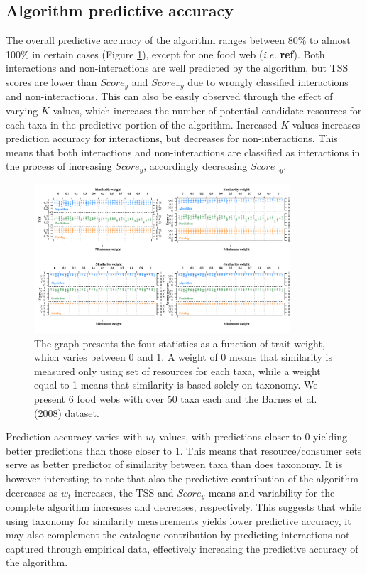 \documentclass[letterpaper]{article}
\begin{document}
    \subsection{Algorithm predictive accuracy}
The overall predictive accuracy of the algorithm ranges between 80\% to almost 100\% in certain cases (Figure \ref{fig:multi_param}), except for one food web (\textit{i.e.} \textbf{ref}). Both interactions and non-interactions are well predicted by the algorithm, but TSS scores are lower than $Score_y$ and $Score_{\neg y}$ due to wrongly classified interactions and non-interactions. This can also be easily observed through the effect of varying $K$ values, which increases the number of potential candidate resources for each taxa in the predictive portion of the algorithm. Increased $K$ values increases prediction accuracy for interactions, but decreases for non-interactions. This means that both interactions and non-interactions are classified as interactions in the process of increasing $Score_y$, accordingly decreasing $Score_{\neg y}$.

\begin{figure}[h]
  \centering\includegraphics[width=0.85\textwidth]{multiple_parameters2.pdf}
  \caption{The graph presents the four statistics as a function of trait weight, which varies between 0 and 1. A weight of 0 means that similarity is measured only using set of resources for each taxa, while a weight equal to 1 means that similarity is based solely on taxonomy. We present 6 food webs with over 50 taxa each and the Barnes et al. (2008) dataset.}
  \label{fig:multi_param}
\end{figure}

Prediction accuracy varies with $w_t$ values, with predictions closer to 0 yielding better predictions than those closer to 1. This means that resource/consumer sets serve as better predictor of similarity between taxa than does taxonomy. It is however interesting to note that also the predictive contribution of the algorithm decreases as $w_t$ increases, the TSS and $Score_y$ means and variability for the complete algorithm increases and decreases, respectively. This suggests that while using taxonomy for similarity measurements yields lower predictive accuracy, it may also complement the catalogue contribution by predicting interactions not captured through empirical data, effectively increasing the predictive accuracy of the algorithm.
\end{document}
